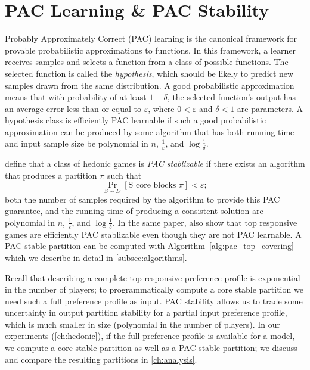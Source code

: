 \section{PAC Learning \& PAC Stability}
\label{sec:pac_learning_pac_stability}
Probably Approximately Correct (PAC) learning is the canonical framework for
provable probabilistic approximations to functions.
In this framework, a learner receives samples and selects a function from a class
of possible functions.
The selected function is called the \textit{hypothesis}, which should be likely
to predict new samples drawn from the same distribution.
A good probabilistic approximation means that with probability of at least
$1 - \delta$, the selected function's output has an average error less than or
equal to $\varepsilon$, where $0 < \varepsilon$ and $\delta < 1$ are parameters.
A hypothesis class is efficiently PAC learnable if such a good probabilistic
approximation can be produced by some algorithm that has both running time and
input sample size be polynomial in $n$, $\frac{1}{\varepsilon}$, and
$\log{\frac{1}{\delta}}$.

 define that a class of hedonic games is
\textit{PAC stablizable}
if there exists an algorithm that produces a partition $\pi$ such that
$$\Pr_{S\sim D}[\text{S core blocks } \pi] < \varepsilon;$$
both the number of samples required by the algorithm to provide this PAC guarantee,
and the running time of producing a consistent solution are polynomial in $n$,
$\frac{1}{\varepsilon}$, and $\log{\frac{1}{\delta}}$.
In the same paper,  also show that top responsive games
are efficiently PAC stablizable even though they are not PAC learnable.
A PAC stable partition can be computed with Algorithm~\ref{alg:pac_top_covering}
which we describe in detail in \autoref{subsec:algorithms}.

Recall that describing a complete top responsive preference profile is exponential
in the number of players; to programmatically compute a core stable partition
we need such a full preference profile as input.
PAC stability allows us to trade some uncertainty in output partition stability
for a partial input preference profile, which is much smaller in size
(polynomial in the number of players).
In our experiments (\autoref{ch:hedonic}), if the full preference profile is
available for a model, we compute a core stable partition as well as a PAC
stable partition; we discuss and compare the resulting partitions in
\autoref{ch:analysis}.

